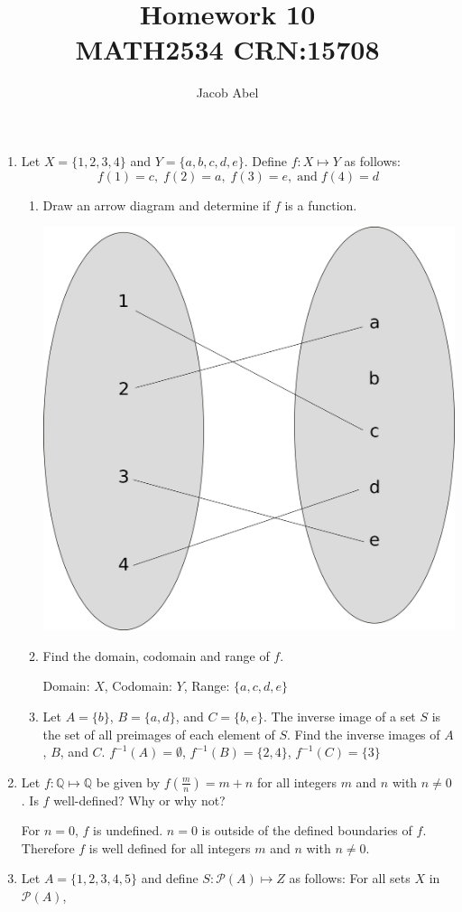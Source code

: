 \documentclass[12pt,letterpaper,titlepage]{article}
\author{Jacob Abel}
\title{	Homework 10
	\\\large MATH2534 CRN:15708
}
\begin{document}
\maketitle
\begin{raggedright}

\begin{enumerate}

\item Let $X = \{1, 2, 3, 4\}$ and $Y = \{a, b, c, d, e\}$. Define $f : X \mapsto Y$ as follows:
\begin{equation*}
f(1) = c,\;f(2) = a,\;f(3) = e,\;\text{and}\;f(4) = d
\end{equation*}
\begin{enumerate}[label=(\alph*)]
\item Draw an arrow diagram and determine if $f$ is a function.
\begin{center}
\includegraphics[width=.30\textwidth, height=\textheight, keepaspectratio=true]{hw10q1a}
\end{center}

\item Find the domain, codomain and range of $f$.

Domain: $X$, Codomain: $Y$, Range: $\{a, c, d, e\}$
\item Let $A = \{b\}$, $B = \{a, d\}$, and $C = \{b, e\}$. The inverse image of a set $S$ is the set of all preimages of each element of $S$. Find the inverse images of $A$, $B$, and $C$.
$f^{-1}(A)=\emptyset$, $f^{-1}(B)=\{2, 4\}$, $f^{-1}(C)=\{3\}$
\end{enumerate}

\item Let $f : \mathbb{Q} \mapsto \mathbb{Q}$ be given by $f(\frac{m}{n}) = m + n$ for all integers $m$ and $n$ with $n \neq 0$. Is $f$ well-defined? Why or why not?

For $n = 0$, $f$ is undefined. $n = 0$ is outside of the defined boundaries of $f$. Therefore $f$ is well defined for all integers $m$ and $n$ with $n \neq 0$.

\item Let $A = \{1, 2, 3, 4, 5\}$ and define $S : \mathcal{P}(A) \mapsto Z$ as follows: For all sets $X$ in $\mathcal{P}(A)$,


\end{enumerate}
\end{raggedright}
\end{document}
